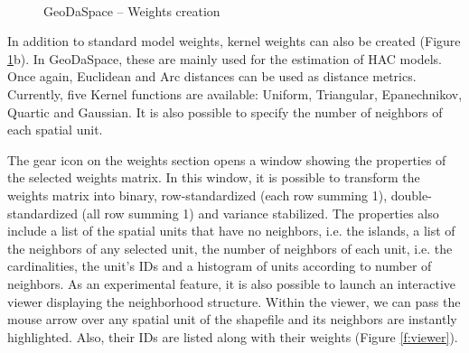 \documentclass{article}
\begin{document}
\begin{figure}[htb]
\centering
{} 
 \\
\caption{GeoDaSpace -- Weights creation}
\label{f:weights}
\end{figure}

In addition to standard model weights, kernel weights can also be created (Figure \ref{f:weights}b). In GeoDaSpace, these are mainly used for the estimation of HAC models. Once again, Euclidean and Arc distances can be used as distance metrics. Currently, five Kernel functions are available: Uniform, Triangular, Epanechnikov, Quartic and Gaussian. It is also possible to specify the number of neighbors of each spatial unit.

The gear icon on the weights section opens a window showing the properties of the selected weights matrix. In this window, it is possible to transform the weights matrix into binary, row-standardized (each row summing 1), double-standardized (all row summing 1) and variance stabilized. The properties also include a list of the spatial units that have no neighbors, i.e. the islands, a list of the neighbors of any selected unit, the number of neighbors of each unit, i.e. the cardinalities, the unit's IDs and a histogram of units according to number of neighbors. As an experimental feature, it is also possible to launch an interactive viewer displaying the neighborhood structure. Within the viewer, we can pass the mouse arrow over any spatial unit of the shapefile and its neighbors are instantly highlighted. Also, their IDs are listed along with their weights (Figure \ref{f:viewer}).
\end{document}
